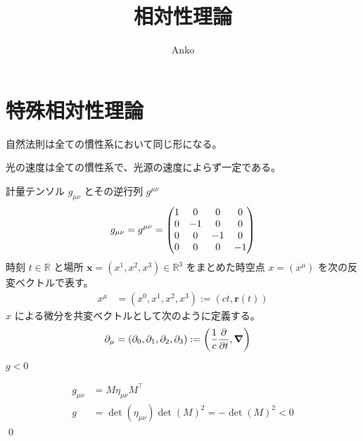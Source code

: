\documentclass[uplatex,dvipdfmx,a4paper,11pt]{jlreq}
\title{相対性理論}
\author{Anko}
\makeatletter
\newcommand{\RR}{\mathbb{R}}
\newcommand{\rr}{\bm{r}}
\theoremstyle{definition}
\renewenvironment{proof}[1][\proofname]{\par
  \normalfont
  \topsep6\p@\@plus6\p@ \trivlist
  \item[\hskip\labelsep{\bfseries #1}\@addpunct{\bfseries}]\ignorespaces\quad\par
}{%
  \qed\endtrivlist\@endpefalse
}
\renewcommand\proofname{証明}
\makeatother
\begin{document}
\maketitle
\tableofcontents
\clearpage

\section{特殊相対性理論}
\begin{definition}
  自然法則は全ての慣性系において同じ形になる。
\end{definition}
\begin{definition}[光速度不変の原理]
  光の速度は全ての慣性系で、光源の速度によらず一定である。
\end{definition}

\begin{definition}
  計量テンソル $g_{\mu\nu}$ とその逆行列 $g^{\mu\nu}$
  \begin{align}
    g_{\mu\nu} = g^{\mu\nu} = \mqty(1 & 0 & 0 & 0 \\ 0 & -1 & 0 & 0 \\ 0 & 0 & -1 & 0 \\ 0 & 0 & 0 & -1)
  \end{align}
  時刻 $t\in\RR$ と場所 $\bm{x} = (x^1, x^2, x^3)\in\RR^3$ をまとめた時空点 $x = (x^\mu)$ を次の反変ベクトルで表す。
  \begin{align}
    x^\mu & = (x^0, x^1, x^2, x^3) := (ct, \rr(t))
  \end{align}
  $x$ による微分を共変ベクトルとして次のように定義する。
  \begin{align}
    \partial_\mu & = (\partial_0, \partial_1, \partial_2, \partial_3) := \qty(\frac{1}{c}\pdv{t}, \vnabla)
  \end{align}
\end{definition}

\begin{proposition}
  $g < 0$
\end{proposition}
\begin{proof}
  \begin{align}
    g_{\mu\nu} & = M\eta_{\mu\nu}M^\top                          \\
    g          & = \det(\eta_{\mu\nu})\det(M)^2 = -\det(M)^2 < 0
  \end{align}
\end{proof}
\end{document}
